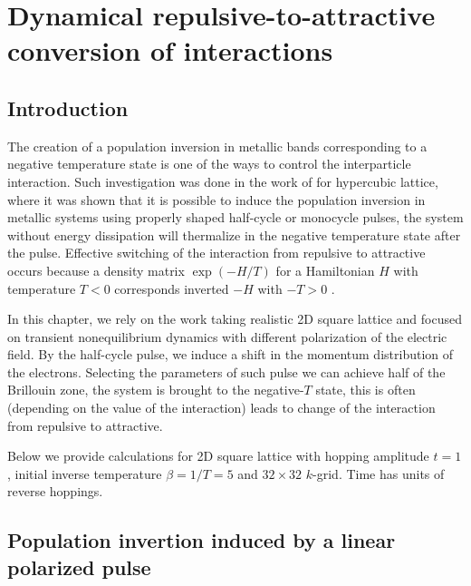 \chapter{Dynamical repulsive-to-attractive conversion of interactions}
\label{chap:pi_pulse}
\section{Introduction}
The creation of a population inversion in metallic bands corresponding to a negative temperature state \citep{PhysRev.81.279,PhysRev.103.20} is one of the ways to control the interparticle interaction. Such investigation was done in the work of \citep{PhysRevB.85.155124} for hypercubic lattice, where it was shown that it is possible to induce the population inversion in metallic systems using properly shaped half-cycle or monocycle pulses, the system without energy dissipation will thermalize in the negative temperature state after the pulse. Effective switching of the interaction from repulsive to attractive occurs because a density matrix $\exp ({-H/T})$ for a Hamiltonian $H$ with temperature $T < 0$ corresponds inverted $-H$ with $-T > 0$ \citep{PhysRevLett.105.220405,PhysRevLett.106.236401}.

In this chapter, we rely on the work \citep{PhysRevB.85.155124} taking realistic 2D square lattice and focused on transient nonequilibrium dynamics with different polarization of the electric field.
By the half-cycle pulse, we induce a shift in the momentum distribution of the electrons. Selecting the parameters of such pulse we can achieve half of the Brillouin zone, the system is brought to the negative-$T$ state, this is often (depending on the value of the interaction) leads to change of the interaction from repulsive to attractive.

Below we provide calculations for 2D square lattice with hopping amplitude $t=1$, initial inverse temperature $\beta=1/T=5$ and $32 \times 32$ $k$-grid. Time has units of reverse hoppings. 
\section{Population invertion induced by a linear polarized pulse}

